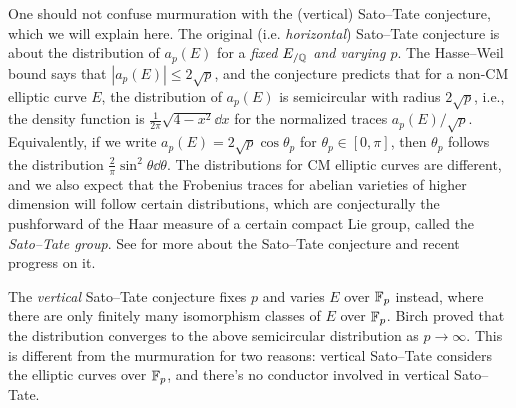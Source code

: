 One should not confuse murmuration with the (vertical) Sato--Tate conjecture, which we will explain here.
The original (i.e. \emph{horizontal}) Sato--Tate conjecture is about the distribution of $a_p(E)$ for a \emph{fixed $E_{/\mathbb{Q}}$ and varying $p$}.
The Hasse--Weil bound says that $|a_p(E)| \le 2 \sqrt{p}$, and the conjecture predicts that for a non-CM elliptic curve $E$, the distribution of $a_p(E)$ is semicircular with radius $2\sqrt{p}$, i.e., the density function is $\frac{1}{2\pi}\sqrt{4 - x^2} \dd x$ for the normalized traces $a_p(E)/\sqrt{p}$.
Equivalently, if we write $a_p(E) = 2 \sqrt{p} \cos \theta_p$ for $\theta_p \in [0, \pi]$, then $\theta_p$ follows the distribution $\frac{2}{\pi} \sin^2 \theta \dd \theta$.
The distributions for CM elliptic curves are different, and we also expect that the Frobenius traces for abelian varieties of higher dimension will follow certain distributions, which are conjecturally the pushforward of the Haar measure of a certain compact Lie group, called the \emph{Sato--Tate group}.
See \cite{sutherland2019sato} for more about the Sato--Tate conjecture and recent progress on it.


The \emph{vertical} Sato--Tate conjecture fixes $p$ and varies $E$ over $\mathbb{F}_p$ instead, where there are only finitely many isomorphism classes of $E$ over $\mathbb{F}_p$.
Birch \cite{birch1968number} proved that the distribution converges to the above semicircular distribution as $p \to \infty$.
This is different from the murmuration for two reasons: vertical Sato--Tate considers the elliptic curves over $\mathbb{F}_p$, and there's no conductor involved in vertical Sato--Tate.
